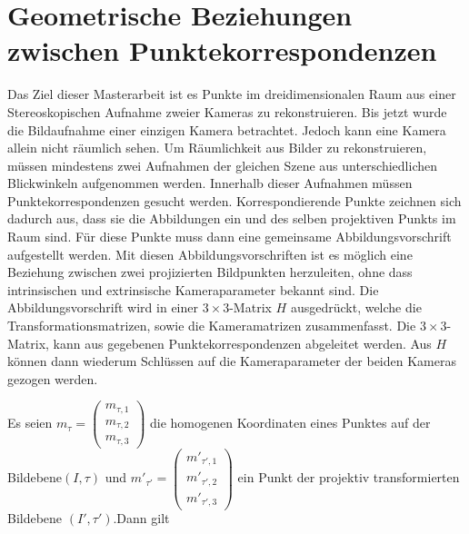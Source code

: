 \chapter{Geometrische Beziehungen zwischen Punktekorrespondenzen}
\label{sec:HFE}

Das Ziel dieser Masterarbeit ist es Punkte im dreidimensionalen Raum aus einer Stereoskopischen Aufnahme zweier Kameras zu rekonstruieren. Bis jetzt wurde die Bildaufnahme einer einzigen Kamera betrachtet. Jedoch kann eine Kamera allein nicht räumlich sehen. Um Räumlichkeit aus Bilder zu rekonstruieren, müssen mindestens zwei Aufnahmen der gleichen Szene aus unterschiedlichen Blickwinkeln aufgenommen werden. Innerhalb dieser Aufnahmen müssen Punktekorrespondenzen gesucht werden. Korrespondierende Punkte zeichnen sich dadurch aus, dass sie die Abbildungen ein und des selben projektiven Punkts im Raum sind. Für diese Punkte muss dann eine gemeinsame Abbildungsvorschrift aufgestellt werden. Mit diesen Abbildungsvorschriften ist es möglich eine Beziehung zwischen zwei projizierten Bildpunkten 
herzuleiten, ohne dass intrinsischen und extrinsische Kameraparameter bekannt sind. Die Abbildungsvorschrift wird in einer $3 \times 3$-Matrix $H$ ausgedrückt, welche die Transformationsmatrizen, sowie die Kameramatrizen zusammenfasst. Die $3 \times 3$-Matrix, kann aus gegebenen Punktekorrespondenzen abgeleitet werden. Aus $H$ können dann wiederum Schlüssen auf die Kameraparameter der beiden Kameras gezogen werden.  


%

Es seien \ensuremath{m_{\tau} = \begin{pmatrix}
		m_{\tau,1}\\m_{\tau,2}\\m_{\tau,3}
\end{pmatrix}} die homogenen Koordinaten eines Punktes auf der Bildebene$(I,\tau)$ und \ensuremath{m'_{\tau'} = \begin{pmatrix}
		m'_{\tau',1}\\m'_{\tau',2}\\m'_{\tau',3}
\end{pmatrix}} ein Punkt der projektiv transformierten Bildebene $(I',\tau')$.Dann gilt

